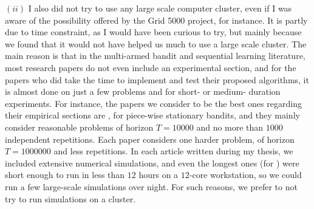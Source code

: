 $(ii)$ I also did not try to use any large scale computer cluster, even if I was aware of the possibility offered by the Grid 5000 project, for instance.
It is partly due to time constraint, as I would have been curious to try, but mainly because we found that it would not have helped us much to use a large scale cluster.
The main reason is that in the multi-armed bandit and sequential learning literature, most research papers do not even include an experimental section, and for the papers who did take the time to implement and test their proposed algorithms, it is almost done on just a few problems and for short- or medium- duration experiments.
For instance, the papers we consider to be the best ones regarding their empirical sections are \cite{LiuLeeShroff17,CaoZhenKvetonXie18}, for piece-wise stationary bandits, and they mainly consider reasonable problems of horizon $T=10000$ and no more than $1000$ independent repetitions. Each paper considers one harder problem, of horizon $T=1000000$ and less repetitions.
%
In each article written during my thesis, we included extensive numerical simulations, and even the longest ones (for \cite{Besson2019GLRT}) were short enough to run in less than $12$ hours on a $12$-core workstation, so we could run a few large-scale simulations over night.
For such reasons, we prefer to not try to run simulations on a cluster.
